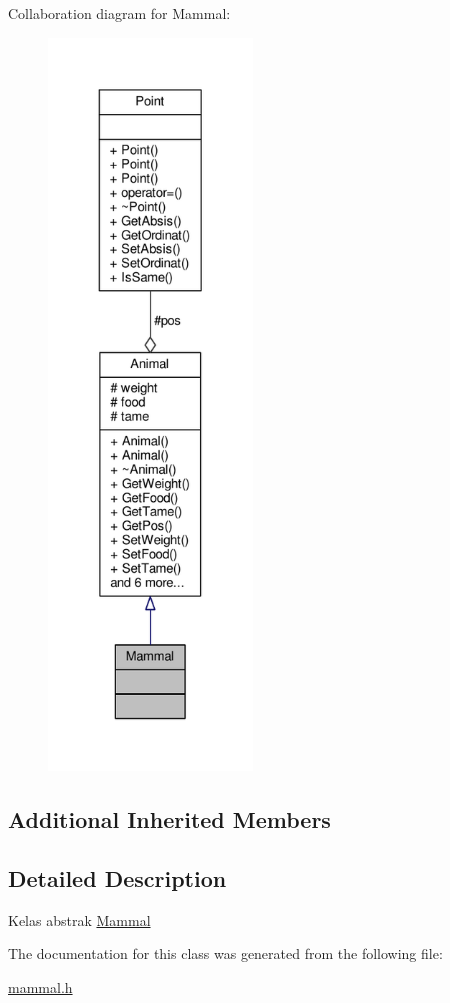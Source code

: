 Collaboration diagram for Mammal\+:
\nopagebreak
\begin{figure}[H]
\begin{center}
\leavevmode
\includegraphics[height=550pt]{classMammal__coll__graph}
\end{center}
\end{figure}
\subsection*{Additional Inherited Members}


\subsection{Detailed Description}
Kelas abstrak \hyperlink{classMammal}{Mammal} 

The documentation for this class was generated from the following file\+:\begin{DoxyCompactItemize}
\item 
\hyperlink{mammal_8h}{mammal.\+h}\end{DoxyCompactItemize}
